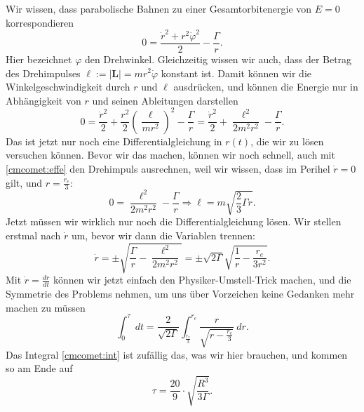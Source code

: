 \begin{Answer}[ref = cmcomet]
	Wir wissen, dass parabolische Bahnen zu einer Gesamtorbitenergie von $E = 0$ korrespondieren
	\begin{equation}\label{cmcomet:edef}
		  0 = \frac{\dot{r}^2 + r^2\dot{\varphi}^2}{2}- \frac{\Gamma}{r}.
	\end{equation}
	Hier bezeichnet $\varphi$ den Drehwinkel. Gleichzeitig wissen wir auch, dass der Betrag des Drehimpulses $\ell := \left|\mathbf{L}\right| = m r^2\dot{\varphi}$ konstant ist. Damit können wir die Winkelgeschwindigkeit durch $r$ und $\ell$ ausdrücken, und können die Energie nur in Abhängigkeit von $r$ und seinen Ableitungen darstellen
	\begin{equation}\label{cmcomet:effe}
		0 =\frac{\dot{r}^2}{2} + \frac{r^2}{2} \left(\frac{\ell}{mr^2}\right)^2 - \frac{\Gamma}{r} = \frac{\dot{r}^2}{2} + \frac{\ell^2}{2m^2r^2} - \frac{\Gamma}{r}.
	\end{equation}
	Das ist jetzt nur noch eine Differentialgleichung in $r\left(t\right)$, die wir zu lösen versuchen können. Bevor wir das machen, können wir noch schnell, auch mit \eqref{cmcomet:effe} den Drehimpuls ausrechnen, weil wir wissen, dass im Perihel $\dot{r} = 0$ gilt, und $r = \frac{r_e}{3}$:
	\begin{equation}\label{cmcomet:ldef}
		0 = \frac{\ell^2}{2m^2r^2} - \frac{\Gamma}{r} \Rightarrow \ell = m \sqrt{\frac{2}{3}\Gamma r}.
	\end{equation}
	Jetzt müssen wir wirklich nur noch die Differentialgleichung lösen. Wir stellen erstmal nach $\dot r$ um, bevor wir dann die Variablen trennen:
	\begin{equation*}
		\dot{r} = \pm \sqrt{\frac{\Gamma}{r} - \frac{\ell^2}{2m^2r^2}} =\pm \sqrt{2\Gamma}\sqrt{\frac{1}{r} -  \frac{r_e}{3r^2}}.
	\end{equation*}
	Mit $\dot{r} = \frac{dr}{dt}$ können wir jetzt einfach den Physiker-Umstell-Trick machen, und die Symmetrie des Problems nehmen, um uns über Vorzeichen keine Gedanken mehr machen zu müssen
	\begin{equation*}
		\int_0^\tau ~dt = \frac{2}{\sqrt{2\Gamma}}\int_{\frac{r_e}{3}}^{r_e} \frac{r}{\sqrt{r- \frac{r_e}{3}}}~dr.
	\end{equation*}
	Das Integral \eqref{cmcomet:int} ist zufällig das, was wir hier brauchen, und kommen so am Ende auf
	\begin{equation*}
		\boxed{\tau = \frac{20}{9} \cdot \sqrt{\frac{R^3}{3\Gamma}}.} 
	\end{equation*}
\end{Answer}